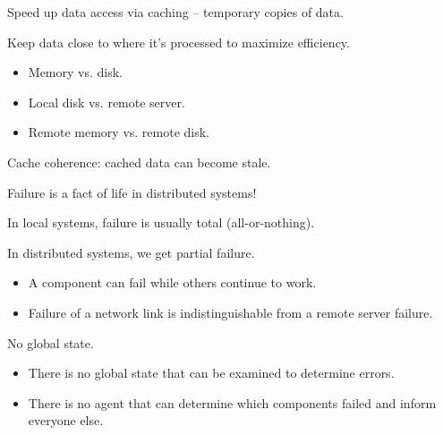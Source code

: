 \begin{slide}

	
	Speed up data access via caching – temporary copies of data.
	\bigskip
	
	Keep data close to where it’s processed to maximize efficiency.
	\begin{itemize}
		\item Memory vs. disk.
		\item Local disk vs. remote server.
		\item Remote memory vs. remote disk.
	\end{itemize}
	\bigskip
	
	Cache coherence: cached data can become stale.

\end{slide}

\begin{slide}

	
	Failure is a fact of life in distributed systems!
	\bigskip
	
	In local systems, failure is usually total (all-or-nothing).
	\bigskip
	
	In distributed systems, we get partial failure.
	\begin{itemize}
		\item A component can fail while others continue to work.
		\item Failure of a network link is indistinguishable from a remote server failure.
	\end{itemize}
	\bigskip
	
	No global state.
	\begin{itemize}
		\item There is no global state that can be examined to determine errors.
		\item There is no agent that can determine which components failed and inform everyone else.
	\end{itemize}
	
\end{slide}

